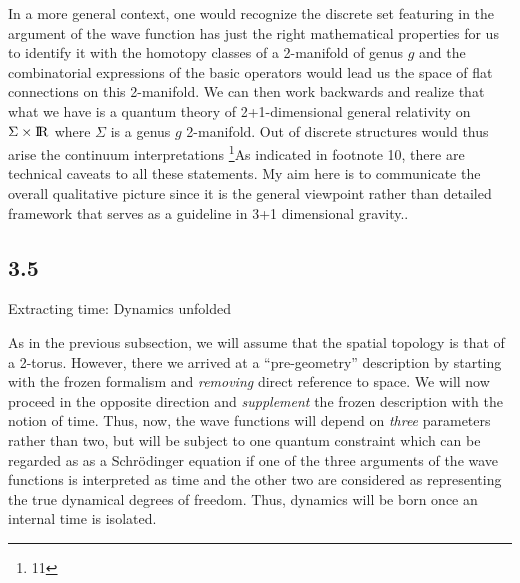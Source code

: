 In a more general context, one would recognize the discrete set featuring
in the argument of the wave function has just the right mathematical
properties for us to identify it with the homotopy classes of a 2-manifold
of genus $g$ and the combinatorial expressions of the basic operators would
lead us the space of flat connections on this 2-manifold. We can then work
backwards and realize that what we have is a quantum theory of 2+1-dimensional
general relativity on $\Sigma\times{\rm I\!R}$ where $\Sigma$ is a genus $g$
2-manifold. Out of discrete structures would thus arise the continuum
interpretations
\footnote{11}{As indicated in footnote 10, there are technical
caveats to all these statements. My aim here is to communicate the overall
qualitative picture since it is the general viewpoint rather than detailed
framework that serves as a guideline in 3+1 dimensional gravity.}.

\goodbreak
\subsection{3.5}{Extracting time: Dynamics unfolded}%

As in the previous subsection, we will assume that the spatial topology is
that of a 2-torus. However, there we arrived at a ``pre-geometry''
description by starting with the frozen formalism and {\it removing} direct
reference to space. We will now proceed in the opposite direction and {\it
supplement} the frozen description with the notion of time. Thus, now, the wave
functions will depend on {\it three} parameters rather than two, but will be
subject to one quantum constraint which can be regarded as as a Schr\"odinger
equation if one of the three arguments of the wave functions is interpreted
as time and the other two are considered as representing the true dynamical
degrees of freedom. Thus, dynamics will be born once an internal time is
isolated.

